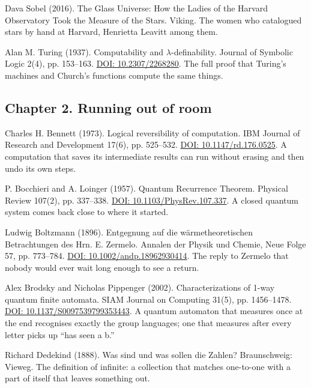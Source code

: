 \documentclass[11pt,twoside]{article}
\theoremstyle{thielethm}
\theoremstyle{thieledef}
\theoremstyle{thieledef}
\theoremstyle{thieledef}
\theoremstyle{thielethm}
\theoremstyle{thieleobs}
\theoremstyle{thielethm}
\begin{document}
\noindent Dava Sobel (2016). The Glass Universe: How the Ladies of the Harvard Observatory Took the Measure of the Stars. Viking. The women who catalogued stars by hand at Harvard, Henrietta Leavitt among them.
\par\medskip

\noindent Alan M. Turing (1937). Computability and $\lambda$-definability. Journal of Symbolic Logic 2(4), pp. 153--163. \href{https://doi.org/10.2307/2268280}{DOI: 10.2307/2268280}. The full proof that Turing's machines and Church's functions compute the same things.
\par\medskip

\subsection*{Chapter 2. Running out of room}

\noindent Charles H. Bennett (1973). Logical reversibility of computation. IBM Journal of Research and Development 17(6), pp. 525--532. \href{https://doi.org/10.1147/rd.176.0525}{DOI: 10.1147/rd.176.0525}. A computation that saves its intermediate results can run without erasing and then undo its own steps.
\par\medskip

\noindent P. Bocchieri and A. Loinger (1957). Quantum Recurrence Theorem. Physical Review 107(2), pp. 337--338. \href{https://doi.org/10.1103/PhysRev.107.337}{DOI: 10.1103/PhysRev.107.337}. A closed quantum system comes back close to where it started.
\par\medskip

\noindent Ludwig Boltzmann (1896). Entgegnung auf die w\"armetheoretischen Betrachtungen des Hrn. E. Zermelo. Annalen der Physik und Chemie, Neue Folge 57, pp. 773--784. \href{https://doi.org/10.1002/andp.18962930414}{DOI: 10.1002/andp.18962930414}. The reply to Zermelo that nobody would ever wait long enough to see a return.
\par\medskip

\noindent Alex Brodsky and Nicholas Pippenger (2002). Characterizations of 1-way quantum finite automata. SIAM Journal on Computing 31(5), pp. 1456--1478. \href{https://doi.org/10.1137/S0097539799353443}{DOI: 10.1137/S0097539799353443}. A quantum automaton that measures once at the end recognises exactly the group languages; one that measures after every letter picks up ``has seen a b.''
\par\medskip

\noindent Richard Dedekind (1888). Was sind und was sollen die Zahlen? Braunschweig: Vieweg. The definition of infinite: a collection that matches one-to-one with a part of itself that leaves something out.
\par\medskip
\end{document}
